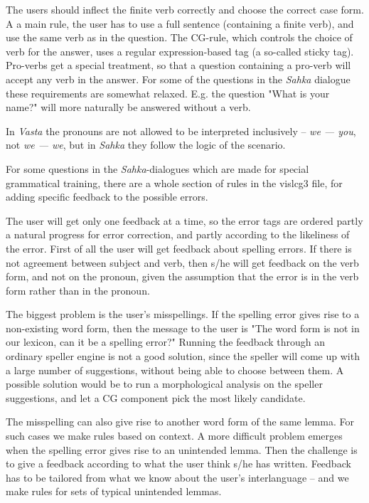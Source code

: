 \documentclass[11pt]{article}
\begin{document}
The users should inflect the finite verb correctly and choose the correct case form. A a main rule, the user has to use a full sentence (containing a finite verb), and use the same verb as in the question. The CG-rule, which controls the choice of verb for the answer, uses a regular expression-based tag (a so-called sticky tag). Pro-verbs get a special treatment, so that a question containing a pro-verb will accept any verb in the answer. For some of the questions in the \textit{Sahka} dialogue these requirements are somewhat relaxed. E.g. the question "What is your name?" will more naturally be answered without a verb. 

In \textit{Vasta} the pronouns are not allowed to be interpreted inclusively -- \textit{we — you}, not \textit{we — we}, but in \textit{Sahka} they follow the logic of the scenario.

For some questions in the \textit{Sahka}-dialogues which are made for special grammatical training, there are a whole section of rules in the vislcg3 file, for adding specific feedback to the possible errors.

The user will get only one feedback at a time, so the error tags are ordered partly a natural progress for error correction, and partly according to the likeliness of the error. First of all the user will get feedback about spelling errors. If there is not agreement between subject and verb, then s/he will get feedback on the verb form, and not on the pronoun, given the assumption that the error is in the verb form rather than in the pronoun.

The biggest problem is the user's misspellings. If the spelling error gives rise to a non-existing word form, then the message to the user is "The word form is not in our lexicon, can it be a spelling error?" 
Running the feedback through an ordinary speller engine is not a good solution, since the speller will come up with a large number of suggestions, without being able to choose between them. A possible solution would be to run a morphological analysis on the speller suggestions, and let a CG component pick the most likely candidate.

The misspelling can also give rise to another word form of the same lemma. For such cases we make rules based on context. A more difficult problem emerges when the spelling error gives rise to an unintended lemma. Then the challenge is to give a feedback according to what the user think s/he has written. Feedback has to be tailored from what we know about the user’s interlanguage – and we make rules for sets of typical unintended lemmas.
\end{document}
